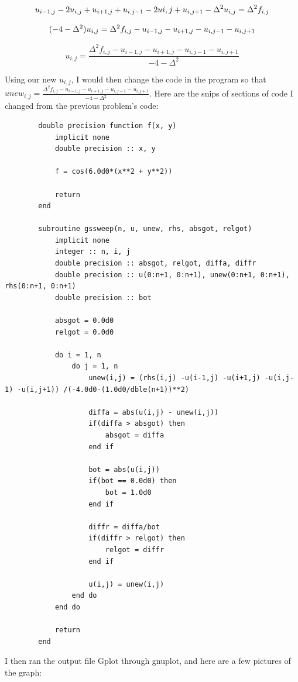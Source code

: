 \documentclass{article}
\begin{document}
	\begin{equation*}	
		u_{i-1,j}-2u_{i,j}+u_{i+1,j}+u_{i,j-1}-2u{i,j}+u_{i,j+1}-\Delta^2u_{i,j}=\Delta^2f_{i,j}\\
	\end{equation*}
	
	\begin{equation*}	
		(-4-\Delta^2)u_{i,j}=\Delta^2f_{i,j}-u_{i-1,j}-u_{i+1,j}-u_{i,j-1}-u_{i,j+1}\\
	\end{equation*}
	
	\begin{equation*}	
		u_{i,j}=\frac{\Delta^2f_{i,j}-u_{i-1,j}-u_{i+1,j}-u_{i,j-1}-u_{i,j+1}}{-4-\Delta^2}
	\end{equation*}
	
	\bigskip
	Using our new $u_{i,j}$, I would then change the code in the program so that $unew_{i,j}=\frac{\Delta^2f_{i,j}-u_{i-1,j}-u_{i+1,j}-u_{i,j-1}-u_{i,j+1}}{-4-\Delta^2}$. Here are the snips of sections of code I changed from the previous problem's code:
	
	
	\begin{verbatim}
		double precision function f(x, y)
			implicit none
			double precision :: x, y

			f = cos(6.0d0*(x**2 + y**2))

			return
		end
		
		subroutine gssweep(n, u, unew, rhs, absgot, relgot)
			implicit none
			integer :: n, i, j
			double precision :: absgot, relgot, diffa, diffr
			double precision :: u(0:n+1, 0:n+1), unew(0:n+1, 0:n+1), rhs(0:n+1, 0:n+1)
			double precision :: bot

			absgot = 0.0d0 
			relgot = 0.0d0 

			do i = 1, n 
				do j = 1, n 
					unew(i,j) = (rhs(i,j) -u(i-1,j) -u(i+1,j) -u(i,j-1) -u(i,j+1)) /(-4.0d0-(1.0d0/dble(n+1))**2)
					
					diffa = abs(u(i,j) - unew(i,j))
					if(diffa > absgot) then 
						absgot = diffa
					end if
					
					bot = abs(u(i,j))
					if(bot == 0.0d0) then
						bot = 1.0d0 
					end if
					
					diffr = diffa/bot 
					if(diffr > relgot) then
						relgot = diffr 
					end if 
					
					u(i,j) = unew(i,j)
				end do 
			end do

			return
		end
	\end{verbatim}
	
	I then ran the output file Gplot through gnuplot, and here are a few pictures of the graph:
		
\end{document}
